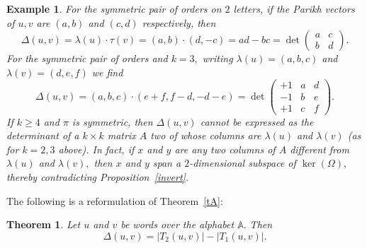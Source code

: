\documentclass[12pt,a4paper]{amsart}
\newcommand{\A}{{\mathbb A}}
\newtheorem{theorem}{Theorem}
\newtheorem{example}{Example}
\begin{document}
\begin{example}\rm For the symmetric pair of orders on $2$ letters,  if the Parikh vectors of $u,v $ are $(a,b)$ and $(c,d)$ respectively, then   
     \begin{equation}\label{ap}   \Delta(u,v) =\lambda (u)\cdot \tau(v)=(a,b)\cdot (d,-c)=ad-bc=\det \begin{pmatrix} a &c\\b & d \end{pmatrix}.\end{equation}
     For the symmetric pair of orders and $k=3,$ writing   $\lambda (u)=(a,b,c)$ and $\lambda (v) =(d,e,f)$  we find
     \begin{equation}   \Delta(u,v) =(a,b,c)\cdot (e+f, f-d, -d-e) =\det \begin{pmatrix} +1&a& d\\-1&b&e\\ +1&c&f \end{pmatrix}.\end{equation} 
If $k\geq 4$ and $\pi$  is symmetric,   then $\Delta(u,v)$ cannot be expressed as the determinant of a $k\times k$ matrix $A$ two of whose columns are $\lambda(u)$ and $\lambda(v)$ (as for $k=2,3$ above).
 In fact, if $x$ and $y$ are any two columns of $A$ different from $\lambda(u)$ and $\lambda(v),$ then $x$ and $y$ span a $2$-dimensional subspace of $\ker (\Omega),$ thereby contradicting Proposition~\ref{invert}.      \end{example}
     
\noindent The following is a reformulation of  Theorem~\ref{tA}: 

      
\begin{theorem}\label{t1}Let $u$ and $v$ be words over the alphabet $\A.$ Then \[\Delta(u,v)=|T_2(u,v)|-|T_1(u,v)|.\] 
\end{theorem}
\end{document}
